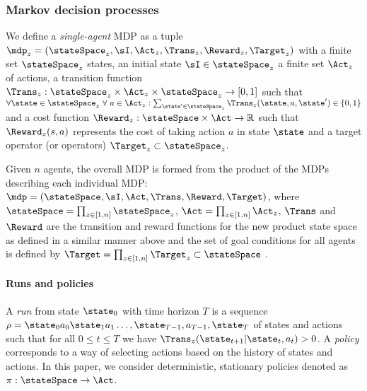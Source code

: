\subsubsection{Markov decision processes}
We define a \emph{single-agent} MDP as a tuple $\mdp_z = (\stateSpace_z, \sI,\Act_z,\Trans_z,\Reward_z,\Target_z)$ with a finite set $\stateSpace_z$ states, an initial state $\sI \in \stateSpace_z$ a finite set $\Act_z$ of actions, a transition function $\Trans_z: \stateSpace_z \times \Act_z \times \stateSpace_z \rightarrow [0,1]$ such that $\forall \state \in \stateSpace_z~\forall~ a\in \Act_z : \sum_{\state'\in \stateSpace_z} \Trans_z(\state,a,\state') \in \lbrace 0,1 \rbrace$ and a cost function $\Reward_z:\stateSpace \times \Act \rightarrow \mathbb{R}$ such that $\Reward_z(s,a)$ represents the cost of taking action $a$ in state $\state$ and a target operator (or operators) $\Target_z \subset \stateSpace_z$. 

Given $n$ agents, the overall MDP is formed from the product of the MDPs describing each individual MDP:
$\mdp = (\stateSpace,\sI,\Act,\Trans,\Reward,\Target)$, where $\stateSpace = \prod_{z \in [1,n]} \stateSpace_z$, $\Act = \prod_{z \in [1,n]} \Act_z$, $\Trans$ and $\Reward$ are the transition and reward functions for the new product state space as defined in a similar manner above and the set of goal conditions for all agents is defined by $\Target = \prod_{z \in [1,n]} \Target_z \subset \stateSpace$ .

\paragraph*{Runs and policies}
A \emph{run} from state $\state_0$ with time horizon $T$ is a sequence $\rho = \state_0 a_0 \state_1 a_1 \dots ,\state_{T-1},a_{T-1},\state_{T}$ of states and actions such that for all $0 \leq t\leq T$ we have $\Trans_z(\state_{t+1}|\state_t,a_t)>0$. 
%
A \emph{policy} corresponds to a way of selecting actions based on the history of states and actions. In this paper, we consider deterministic, stationary policies denoted as $\pi:\stateSpace \rightarrow \Act$. 
